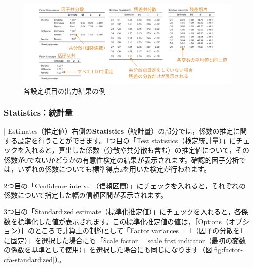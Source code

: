 \documentclass[
  12pt,
  a5jpaper,
  lualatex, ja=standard]{bxjsbook}
\begin{document}
\begin{figure}[!ht]

{\centering \includegraphics[width=1\linewidth]{images/factor/cfa-estimates-results} 

}

\caption{各設定項目の出力結果の例}\label{fig:factor-cfa-estimates-results}
\end{figure}

\hypertarget{subsub:factor-cfa-statistics}{%
\subsubsection*{Statistics：統計量}\label{subsub:factor-cfa-statistics}}

\colorbox{bar}{\textcolor{gmoji2}{| Estimates}}（推定値）右側の\textbf{Statistics}（統計量）の部分では，係数の推定に関する設定を行うことができます。1つ目の「Test statistics（検定統計量）」にチェックを入れると，算出した係数（分散や共分散も含む）の推定値について，その係数が0でないかどうかの有意性検定の結果が表示されます。確認的因子分析では，いずれの係数についても標準得点zを用いた検定が行われます。

2つ目の「Confidence interval（信頼区間）」にチェックを入れると，それぞれの係数について指定した幅の信頼区間が表示されます。

3つ目の「Standardized estimate（標準化推定値）」にチェックを入れると，各係数を標準化した値が表示されます。この標準化推定値の値は，［Options（オプション）］のところで計算上の制約として「Factor variances = 1（因子の分散を1に固定）」を選択した場合にも「Scale factor = scale first indicator（最初の変数の係数を基準として使用）」を選択した場合にも同じになります（図\ref{fig:factor-cfa-standardized}）。
\end{document}
